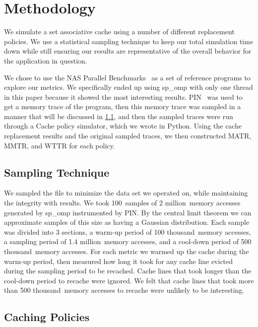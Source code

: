 \newcommand{\SAMPN}{100}
\newcommand{\SAMPK}{2 million}
\newcommand{\SAMP}{1.4 million}
\newcommand{\WARM}{100 thousand}
\newcommand{\COOL}{500 thousand}

\section{Methodology}
We simulate a set associative cache using a number of different
replacement policies.
We use a statistical sampling technique to keep our total simulation
time down while still ensuring our results are representative of the
overall behavior for the application in question.

We chose to use the NAS Parallel Benchmarks~\cite{bailey94} as a set of reference programs to explore our metrics.
We specifically ended up using sp\_omp with only one thread in this paper because it showed the most interesting results.
PIN~\cite{lukcohn05} was used to get a memory trace of the program,
 then this memory trace was sampled in a manner that will be discussed in \ref{sec:sampling},
 and then the sampled traces were run through a Cache policy simulator, which we wrote in Python.
Using the cache replacement results and the original sampled traces, we then constructed MATR, MMTR, and WTTR for each policy.

\subsection{Sampling Technique}
\label{sec:sampling}
We sampled the file to minimize the data set we operated on, while maintaining the integrity with results.
	We took \SAMPN~samples of \SAMPK~memory accesses generated by sp\_omp instrumented by PIN.
	By the central limit theorem we can approximate samples of this size as having a Gaussian distribution.
	Each sample was divided into 3 sections, a warm-up period of \WARM~memory accesses,
		a sampling period of \SAMP~memory accesses, and a cool-down period of \COOL~memory accesses.
	For each metric we warmed up the cache during the warm-up period,
		then measured how long it took for any cache line evicted during the sampling period to be recached.
	Cache lines that took longer than the cool-down period to recache were ignored.
	We felt that cache lines that took more than \COOL~memory accesses to recache were unlikely to be interesting.

\subsection{Caching Policies}
\label{sec:policies}

